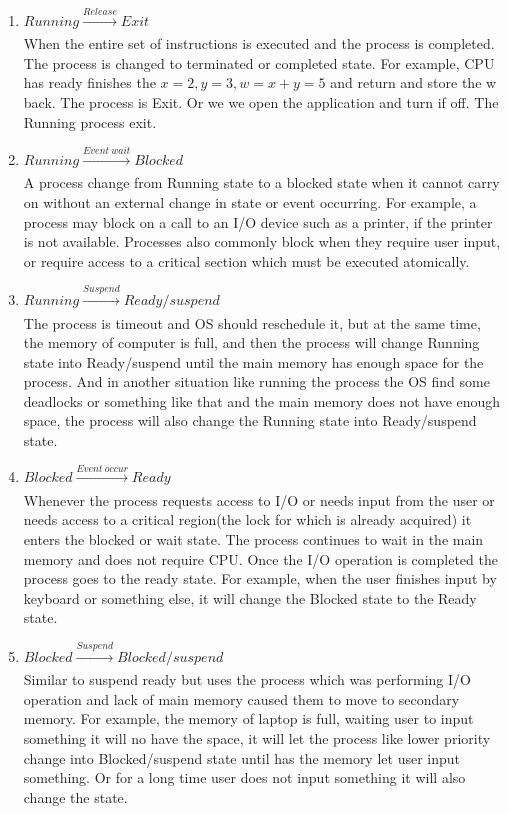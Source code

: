 \documentclass[12pt]{article}
\newenvironment{sol}[1][Solution]{\begin{trivlist}\item[\hskip\labelsep {\bfseries #1:}]}{\end{trivlist}}
\begin{document}
\begin{enumerate}
\begin{sol}
\begin{enumerate}
    \item $Running \xrightarrow[]{Release} Exit$\\
        When the entire set of instructions is executed and the process is completed. The process is changed to terminated or completed state. For example, CPU has ready finishes the $x=2, y= 3, w = x + y = 5$ and return and store the w back. The process is Exit. Or we we open the application and turn if off. The Running process exit. 
    \item $Running \xrightarrow[]{Event \ wait} Blocked$\\
        A process change from Running state to a blocked state when it cannot carry on without an external change in state or event occurring. For example, a process may block on a call to an I/O device such as a printer, if the printer is not available. Processes also commonly block when they require user input, or require access to a critical section which must be executed atomically. 
    \item $Running \xrightarrow[]{Suspend} Ready/suspend$\\
        The process is timeout and OS should reschedule it, but at the same time, the memory of computer is full, and then the process will change Running state into Ready/suspend until the main memory has enough space for the process. And in another situation like running the process the OS find some deadlocks or something like that and the main memory does not have enough space, the process will also change the Running state into Ready/suspend state.
    \item $Blocked \xrightarrow[]{Event \ occur} Ready$\\
        Whenever the process requests access to I/O or needs input from the user or needs access to a critical region(the lock for which is already acquired) it enters the blocked or wait state. The process continues to wait in the main memory and does not require CPU. Once the I/O operation is completed the process goes to the ready state. For example, when the user finishes input by keyboard or something else, it will change the Blocked state to the Ready state.
    \item $Blocked \xrightarrow[]{Suspend} Blocked/suspend$\\
    Similar to suspend ready but uses the process which was performing I/O operation and lack of main memory caused them to move to secondary memory. For example, the memory of laptop is full, waiting user to input something it will no have the space, it will let the process like lower priority change into Blocked/suspend state until has the memory let user input something. Or for a long time user does not input something it will also change the state.

\end{enumerate}
\end{sol}
\end{enumerate}
\end{document}
